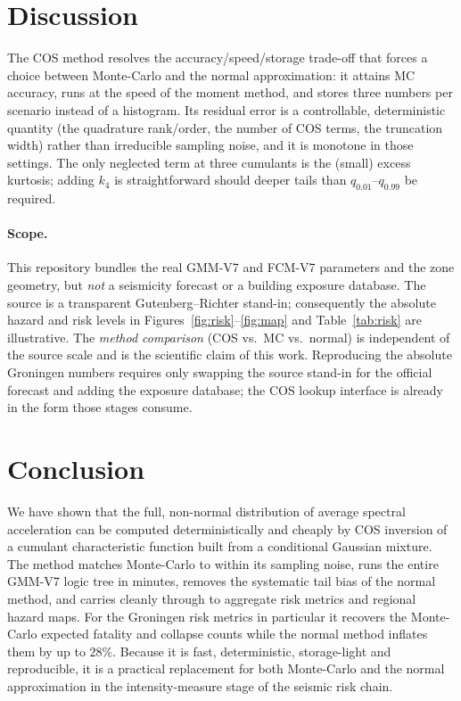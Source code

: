 \documentclass[11pt,a4paper]{article}
\begin{document}
\section{Discussion}\label{sec:scope}
The COS method resolves the accuracy/speed/storage trade-off that forces a choice
between Monte-Carlo and the normal approximation: it attains MC accuracy, runs at
the speed of the moment method, and stores three numbers per scenario instead of
a histogram. Its residual error is a controllable, deterministic quantity (the
quadrature rank/order, the number of COS terms, the truncation width) rather than
irreducible sampling noise, and it is monotone in those settings. The only
neglected term at three cumulants is the (small) excess kurtosis; adding $k_4$ is
straightforward should deeper tails than $q_{0.01}$--$q_{0.99}$ be required.

\paragraph{Scope.} This repository bundles the real GMM-V7 and FCM-V7 parameters
and the zone geometry, but \emph{not} a seismicity forecast or a building
exposure database. The source is a transparent Gutenberg--Richter stand-in;
consequently the absolute hazard and risk levels in
Figures~\ref{fig:risk}--\ref{fig:map} and Table~\ref{tab:risk} are illustrative.
The \emph{method comparison} (COS vs.\ MC vs.\ normal) is independent of the
source scale and is the scientific claim of this work. Reproducing the absolute
Groningen numbers requires only swapping the source stand-in for the official
forecast and adding the exposure database; the COS lookup interface is already in
the form those stages consume.

\section{Conclusion}
We have shown that the full, non-normal distribution of average spectral
acceleration can be computed deterministically and cheaply by COS inversion of a
cumulant characteristic function built from a conditional Gaussian mixture. The
method matches Monte-Carlo to within its sampling noise, runs the entire GMM-V7
logic tree in minutes, removes the systematic tail bias of the normal method, and
carries cleanly through to aggregate risk metrics and regional hazard maps. For
the Groningen risk metrics in particular it recovers the Monte-Carlo expected
fatality and collapse counts while the normal method inflates them by up to
$28\%$. Because it is fast, deterministic, storage-light and reproducible, it is a
practical replacement for both Monte-Carlo and the normal approximation in the
intensity-measure stage of the seismic risk chain.
\end{document}
